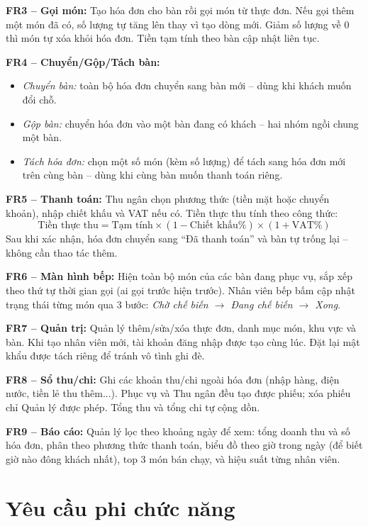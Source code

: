 \documentclass[12pt,a4paper]{report}
\begin{document}
\textbf{FR3 -- Gọi món:} Tạo hóa đơn cho bàn rồi gọi món từ thực đơn. Nếu gọi thêm một món đã có, số lượng tự tăng lên thay vì tạo dòng mới. Giảm số lượng về 0 thì món tự xóa khỏi hóa đơn. Tiền tạm tính theo bàn cập nhật liên tục.

\textbf{FR4 -- Chuyển/Gộp/Tách bàn:}
\begin{itemize}
  \item \textit{Chuyển bàn:} toàn bộ hóa đơn chuyển sang bàn mới -- dùng khi khách muốn đổi chỗ.
  \item \textit{Gộp bàn:} chuyển hóa đơn vào một bàn đang có khách -- hai nhóm ngồi chung một bàn.
  \item \textit{Tách hóa đơn:} chọn một số món (kèm số lượng) để tách sang hóa đơn mới trên cùng bàn -- dùng khi cùng bàn muốn thanh toán riêng.
\end{itemize}

\textbf{FR5 -- Thanh toán:} Thu ngân chọn phương thức (tiền mặt hoặc chuyển khoản), nhập chiết khấu và VAT nếu có. Tiền thực thu tính theo công thức:
\[
  \text{Tiền thực thu} = \text{Tạm tính} \times (1 - \text{Chiết khấu\%}) \times (1 + \text{VAT\%})
\]
Sau khi xác nhận, hóa đơn chuyển sang ``Đã thanh toán'' và bàn tự trống lại -- không cần thao tác thêm.

\textbf{FR6 -- Màn hình bếp:} Hiện toàn bộ món của các bàn đang phục vụ, sắp xếp theo thứ tự thời gian gọi (ai gọi trước hiện trước). Nhân viên bếp bấm cập nhật trạng thái từng món qua 3 bước: \textit{Chờ chế biến $\rightarrow$ Đang chế biến $\rightarrow$ Xong}.

\textbf{FR7 -- Quản trị:} Quản lý thêm/sửa/xóa thực đơn, danh mục món, khu vực và bàn. Khi tạo nhân viên mới, tài khoản đăng nhập được tạo cùng lúc. Đặt lại mật khẩu được tách riêng để tránh vô tình ghi đè.

\textbf{FR8 -- Sổ thu/chi:} Ghi các khoản thu/chi ngoài hóa đơn (nhập hàng, điện nước, tiền lẻ thu thêm...). Phục vụ và Thu ngân đều tạo được phiếu; xóa phiếu chỉ Quản lý được phép. Tổng thu và tổng chi tự cộng dồn.

\textbf{FR9 -- Báo cáo:} Quản lý lọc theo khoảng ngày để xem: tổng doanh thu và số hóa đơn, phân theo phương thức thanh toán, biểu đồ theo giờ trong ngày (để biết giờ nào đông khách nhất), top 3 món bán chạy, và hiệu suất từng nhân viên.

\section{Yêu cầu phi chức năng}
\end{document}
